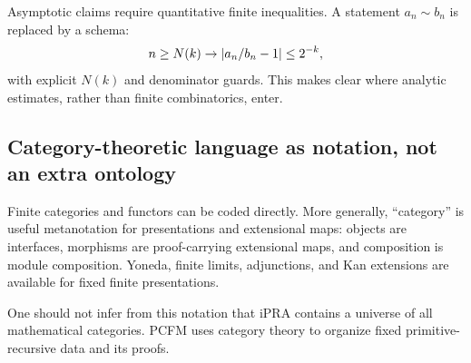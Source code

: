 Asymptotic claims require quantitative finite inequalities.  A statement
\(a_n\sim b_n\) is replaced by a schema:
\[
 n\ge N(k)\rightarrow
   |a_n/b_n-1|\le2^{-k},
\]
with explicit \(N(k)\) and denominator guards.  This makes clear where
analytic estimates, rather than finite combinatorics, enter.

\subsection{Category-theoretic language as notation, not an extra ontology}

Finite categories and functors can be coded directly.  More generally,
``category'' is useful metanotation for presentations and extensional maps:
objects are interfaces, morphisms are proof-carrying extensional maps, and
composition is module composition.  Yoneda, finite limits, adjunctions, and
Kan extensions are available for fixed finite presentations.

One should not infer from this notation that iPRA contains a universe of all
mathematical categories.  PCFM uses category theory to organize fixed
primitive-recursive data and its proofs.
